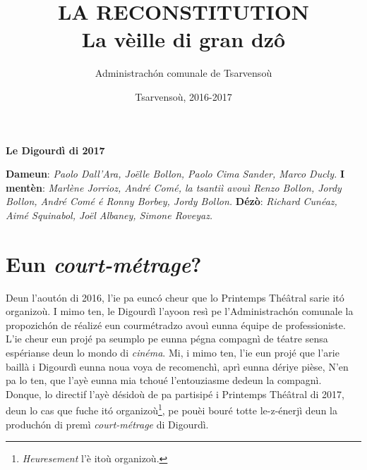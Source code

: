 \title{LA RECONSTITUTION\\ La vèille di gran dz\^{o}}
\author{Administrach\'on comunale de Tsarvensoù}
\date{Tsarvensoù, 2016-2017}

\maketitle

\markboth{\MakeUppercase{\thetitle}}{\MakeUppercase{\thetitle}}

\cleardoublepage 
\vspace*{\fill}
\begin{center}
\textbf{\LARGE Le Digourdì di 2017}
\end{center}

\begin{figure}[h]
\centering
{}
\end{figure}
\noindent
\textbf{Dameun}: \textit{Paolo Dall'Ara, Jo\"{e}lle Bollon, Paolo Cima Sander, Marco Ducly.}
\newline
\newline
\textbf{I mentèn}: \textit{Marlène Jorrioz, André Comé, la tsantiì avouì Renzo Bollon, Jordy Bollon,  André Comé é Ronny Borbey, Jordy Bollon.}
\newline
\newline
\textbf{Dézò}: \textit{Richard Cunéaz, Aimé Squinabol, Jo\"{e}l Albaney, Simone Roveyaz.}


\section*{Eun \textit{court-métrage}?}
Deun l'aout\'on di 2016, l'ie pa eunc\'o cheur que lo Printemps Thé\^atral sarie it\'o organizoù. I mimo ten, le Digourdì l'ayoon resì pe l'Administrach\'on comunale la propozich\'on de réalizé eun courmétradzo avouì eunna équipe de professioniste. L'ie cheur eun projé pa seumplo pe eunna pégna compagnì de téatre sensa espérianse deun lo mondo di \textit{cinéma}. Mi, i mimo ten, l'ie eun projé que l'arie baillà i Digourdì eunna noua voya de recomenchì, aprì eunna dériye pièse, \og N'en pa lo ten\fg, que l'ayè eunna mia tchoué l'entouziasme dedeun la compagnì. 
\\Donque, lo directif l'ayè désidoù de pa partisipé i Printemps Thé\^atral di 2017, deun lo cas que fuche it\'o organizoù\footnote{ \textit{Heuresement} l'è itoù organizoù.}, pe pouèi bouré totte le-z-énerjì deun la produch\'on di premì \textit{court-métrage} di Digourdì.

